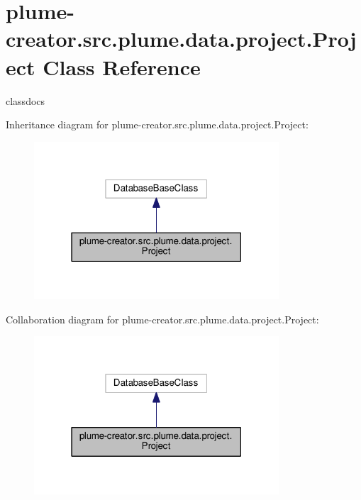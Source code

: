 \hypertarget{classplume-creator_1_1src_1_1plume_1_1data_1_1project_1_1_project}{}\section{plume-\/creator.src.\+plume.\+data.\+project.\+Project Class Reference}
\label{classplume-creator_1_1src_1_1plume_1_1data_1_1project_1_1_project}


classdocs  




Inheritance diagram for plume-\/creator.src.\+plume.\+data.\+project.\+Project\+:\nopagebreak
\begin{figure}[H]
\begin{center}
\leavevmode
\includegraphics[width=259pt]{classplume-creator_1_1src_1_1plume_1_1data_1_1project_1_1_project__inherit__graph}
\end{center}
\end{figure}


Collaboration diagram for plume-\/creator.src.\+plume.\+data.\+project.\+Project\+:\nopagebreak
\begin{figure}[H]
\begin{center}
\leavevmode
\includegraphics[width=259pt]{classplume-creator_1_1src_1_1plume_1_1data_1_1project_1_1_project__coll__graph}
\end{center}
\end{figure}
